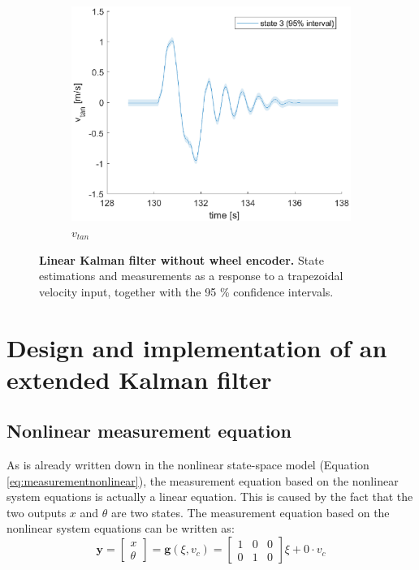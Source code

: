 \documentclass[a4paper,kul]{kulakarticle} %
\begin{document}
\begin{figure}[htp!]
	
	\begin{subfigure}[b]{0.48\textwidth}
		\centering 
		\includegraphics[width=\textwidth]{state3_w.eps}
		\caption{$v_{tan}$}
	\end{subfigure}
	\caption{\textbf{Linear Kalman filter without wheel encoder.} State estimations and measurements as a response to a trapezoidal velocity input, together with the 95 \% confidence intervals.} 
	\label{fig:confidence2}
\end{figure}
	
\section{Design and implementation of an extended Kalman filter}
\subsection{Nonlinear measurement equation}
As is already written down in the nonlinear state-space model (Equation \ref{eq:measurementnonlinear}), the measurement equation based on the nonlinear system equations is actually a linear equation. This is caused by the fact that the two outputs $x$ and $\theta$ are two states. The measurement equation based on the nonlinear system equations can be written as:
\begin{equation}
	\mathbf{y} = \begin{bmatrix}
	x\\\theta
	\end{bmatrix} = \mathbf{g}(\xi,v_c) = \begin{bmatrix}
	1&0&0\\0&1&0
	\end{bmatrix}\xi + 0 \cdot v_c
	\label{eq:g}
\end{equation}
\end{document}
